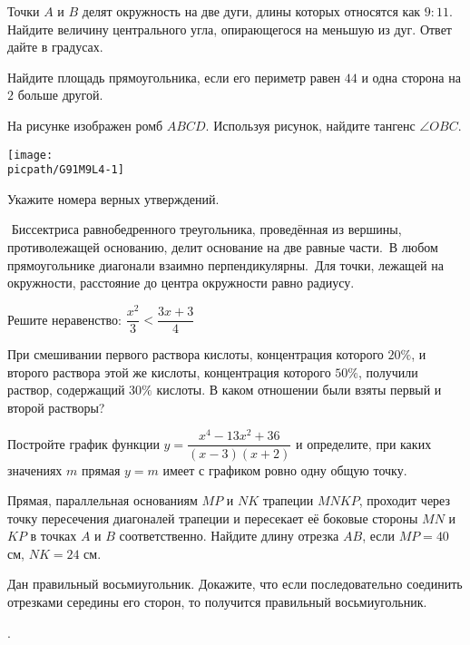 \begin{class}[number=4]
\begin{listofex}
		\item Точки \(A\) и \(B\) делят окружность на две дуги, длины которых относятся как \(9:11\). Найдите величину центрального угла, опирающегося на меньшую из дуг. Ответ дайте в градусах.
		\item Найдите площадь прямоугольника, если его периметр равен \(44\) и одна сторона на \(2\) больше другой.
		\item На рисунке изображен ромб \(ABCD\). Используя рисунок, найдите  тангенс \(\angle OBC\).
		\begin{center}
			\texttt{[image: \\picpath/G91M9L4-1]}
		\end{center}
		\item Укажите номера верных утверждений.
		\begin{tasks}
			\task  Биссектриса равнобедренного треугольника, проведённая из вершины, противолежащей основанию, делит основание на две равные части.
			\task В любом прямоугольнике диагонали взаимно перпендикулярны.
			\task Для точки, лежащей на окружности, расстояние до центра окружности равно радиусу.
		\end{tasks}
		\item Решите неравенство: \(\dfrac{ x^2 }{ 3 }<\dfrac{ 3x+3 }{ 4 }\)
		\item При смешивании первого раствора кислоты, концентрация которого \(20\%\), и второго раствора этой же кислоты, концентрация которого \(50\%\), получили раствор, содержащий \(30\%\) кислоты. В каком отношении были взяты первый и второй растворы?
		\item Постройте график функции \(y=\dfrac{ x^4-13x^2+36 }{ (x-3)(x+2) }\) и определите, при каких значениях \(m\) прямая \(y=m\) имеет с графиком ровно одну общую точку.
		\item Прямая, параллельная основаниям \(MP\) и \(NK\) трапеции \(MNKP\), проходит через точку пересечения диагоналей трапеции и пересекает её боковые стороны \(MN\) и \(KP\) в точках  \(A\) и \(B\) соответственно. Найдите длину отрезка \(AB\), если \(MP=40\) см, \(NK=24\) см.
		\item Дан правильный восьмиугольник. Докажите, что если последовательно соединить отрезками середины его сторон, то получится правильный восьмиугольник.
	\end{listofex}
\end{class}

\begin{homework}[number=2]
	\begin{listofex}
		\item .
	\end{listofex}
\end{homework}


